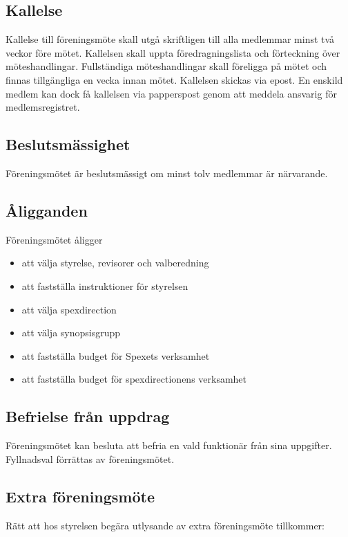 \documentclass[a4paper]{article}
\begin{document}
\subsection{Kallelse}
Kallelse till föreningsmöte skall utgå skriftligen till alla medlemmar minst två veckor före mötet. Kallelsen skall uppta föredragningslista och förteckning över möteshandlingar. Fullständiga möteshandlingar skall föreligga på mötet och finnas tillgängliga en vecka innan mötet.\newline
\newline
Kallelsen skickas via epost. En enskild medlem kan dock få kallelsen via papperspost genom att meddela ansvarig för medlemsregistret.

\subsection{Beslutsmässighet}
Föreningsmötet är beslutsmässigt om minst tolv medlemmar är närvarande.

\subsection{Åligganden}
Föreningsmötet åligger

\begin{itemize}
  \item att välja styrelse, revisorer och valberedning
  \item att fastställa instruktioner för styrelsen
  \item att välja spexdirection
  \item att välja synopsisgrupp
  \item att fastställa budget för Spexets verksamhet
  \item att fastställa budget för spexdirectionens verksamhet
\end{itemize}

\subsection{Befrielse från uppdrag}
Föreningsmötet kan besluta att befria en vald funktionär från sina uppgifter. Fyllnadsval förrättas av föreningsmötet.

\subsection{Extra föreningsmöte}
Rätt att hos styrelsen begära utlysande av extra föreningsmöte tillkommer:
\end{document}
